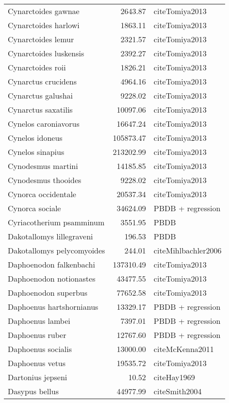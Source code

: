\begin{table}[ht]
\begin{tabular}{lrl}
  Cynarctoides gawnae & 2643.87 & cite{Tomiya2013} \\ 
  Cynarctoides harlowi & 1863.11 & cite{Tomiya2013} \\ 
  Cynarctoides lemur & 2321.57 & cite{Tomiya2013} \\ 
  Cynarctoides luskensis & 2392.27 & cite{Tomiya2013} \\ 
  Cynarctoides roii & 1826.21 & cite{Tomiya2013} \\ 
  Cynarctus crucidens & 4964.16 & cite{Tomiya2013} \\ 
  Cynarctus galushai & 9228.02 & cite{Tomiya2013} \\ 
  Cynarctus saxatilis & 10097.06 & cite{Tomiya2013} \\ 
  Cynelos caroniavorus & 16647.24 & cite{Tomiya2013} \\ 
  Cynelos idoneus & 105873.47 & cite{Tomiya2013} \\ 
  Cynelos sinapius & 213202.99 & cite{Tomiya2013} \\ 
  Cynodesmus martini & 14185.85 & cite{Tomiya2013} \\ 
  Cynodesmus thooides & 9228.02 & cite{Tomiya2013} \\ 
  Cynorca occidentale & 20537.34 & cite{Tomiya2013} \\ 
  Cynorca sociale & 34624.09 & PBDB + regression \\ 
  Cyriacotherium psamminum & 3551.95 & PBDB \\ 
  Dakotallomys lillegraveni & 196.53 & PBDB \\ 
  Dakotallomys pelycomyoides & 244.01 & cite{Mihlbachler2006} \\ 
  Daphoenodon falkenbachi & 137310.49 & cite{Tomiya2013} \\ 
  Daphoenodon notionastes & 43477.55 & cite{Tomiya2013} \\ 
  Daphoenodon superbus & 77652.58 & cite{Tomiya2013} \\ 
  Daphoenus hartshornianus & 13329.17 & PBDB + regression \\ 
  Daphoenus lambei & 7397.01 & PBDB + regression \\ 
  Daphoenus ruber & 12767.60 & PBDB + regression \\ 
  Daphoenus socialis & 13000.00 & cite{McKenna2011} \\ 
  Daphoenus vetus & 19535.72 & cite{Tomiya2013} \\ 
  Dartonius jepseni & 10.52 & cite{Hay1969} \\ 
  Dasypus bellus & 44977.99 & cite{Smith2004} \\ 

\end{tabular}
\end{table}

